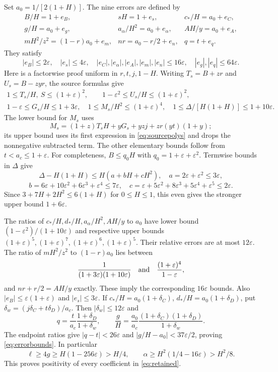 \documentclass[10pt]{article}
\newcommand{\eps}{\varepsilon}
\begin{document}
Set \(a_0=1/[2(1+H)]\). The nine errors are defined by
\begin{equation}
\begin{array}{lll}
 B/H=1+e_B,&sH=1+e_s,&c_*/H=a_0+e_C,\\
 g/H=a_0+e_g,&a_\alpha/H^2=a_0+e_\alpha,&AH/y=a_0+e_A,\\
 mH^2/z^2=(1-r)a_0+e_m,&nr=a_0-r/2+e_n,&q=t+e_q.
\end{array}\label{eq:errors}
\end{equation}
They satisfy
\begin{equation}
 |e_B|\le2\eps,\quad |e_s|\le4\eps,\quad
 |e_C|,|e_\alpha|,|e_A|,|e_m|,|e_n|\le16\eps,\quad
 |e_g|,|e_q|\le64\eps.                              \label{eq:errorbounds}
\end{equation}
Here is a factorwise proof uniform in \(r,t,j,1-H\).
Writing \(T_s=B+zr\) and \(U_s=B-zyr\), the source formulas give
\begin{equation}
\begin{gathered}
 1\le T_s/H,\ S\le(1+\eps)^2,\qquad
 1-\eps^2\le U_s/H\le(1+\eps)^2,\\
 1-\eps\le G_s/H\le1+3\eps,\quad
 1\le M_s/H^2\le(1+\eps)^4,\quad
 1\le\Delta/[H(1+H)]\le1+10\eps .                  \label{eq:envelopes}
\end{gathered}
\end{equation}
The lower bound for \(M_s\) uses
\[
 M_s=(1+z)T_sH+yG_s+yzj+zr(yt)(1+y);
\]
its upper bound uses its first expression in \eqref{eq:sourcepolys}
and drops the nonnegative subtracted term. The other elementary bounds
follow from \(t<a_c\le1+\eps\).
For completeness, \(B\le q_0H\) with \(q_0=1+\eps+\eps^2\).
Termwise bounds in \(\Delta\) give
\[
 \Delta-H(1+H)\le H(a+bH+cH^2),\quad
 a=2\eps+\eps^2\le3\eps,
\]
\[
 b=6\eps+10\eps^2+6\eps^3+\eps^4\le7\eps,\quad
 c=\eps+5\eps^2+8\eps^3+5\eps^4+\eps^5\le2\eps .
\]
Since \(3+7H+2H^2\le6(1+H)\) for \(0\le H\le1\), this even
gives the stronger upper bound \(1+6\eps\).

The ratios of \(c_*/H,d_*/H,a_\alpha/H^2,AH/y\) to \(a_0\)
have lower bound \((1-\eps^2)/(1+10\eps)\) and respective upper
bounds \((1+\eps)^5,(1+\eps)^7,(1+\eps)^6,(1+\eps)^5\).
Their relative errors are at most \(12\eps\).
The ratio of \(mH^2/z^2\) to \((1-r)a_0\) lies between
\[
 \frac1{(1+3\eps)(1+10\eps)}
 \quad\hbox{and}\quad \frac{(1+\eps)^4}{1-\eps},
\]
and \(nr+r/2=AH/y\) exactly. These imply the corresponding
\(16\eps\) bounds. Also
\(|e_B|\le\eps(1+\eps)\) and \(|e_s|\le3\eps\).
If \(c_*/H=a_0(1+\delta_C)\), \(d_*/H=a_0(1+\delta_D)\),
put \(\delta_w=(j\delta_C+t\delta_D)/a_c\).
Then \(|\delta_w|\le12\eps\) and
\[
 q=\frac t{a_c}\frac{1+\delta_D}{1+\delta_w},\qquad
 \frac gH=\frac{a_0}{a_c}
           \frac{(1+\delta_C)(1+\delta_D)}{1+\delta_w}.
\]
The endpoint ratios give \(|q-t|<26\eps\) and
\(|g/H-a_0|<37\eps/2\), proving \eqref{eq:errorbounds}.
In particular
\[
 \ell\ge4g\ge H(1-256\eps)>H/4,\qquad
 \alpha\ge H^2(1/4-16\eps)>H^2/8.
\]
This proves positivity of every coefficient in \eqref{eq:retained}.
\end{document}
